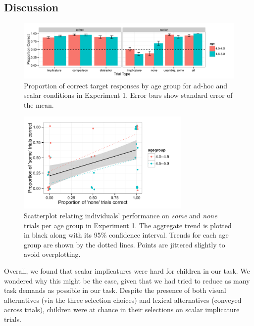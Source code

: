 \documentclass[10pt,letterpaper]{article}
\begin{document}
\subsection{Discussion}

\begin{figure}[t] 
  \begin{center} 
    \includegraphics[width=7.5in]{figures/implicatures_adhocScalar_long.pdf} 
    \caption{\label{fig:expt1} Proportion of correct target responses by age group for ad-hoc and scalar conditions in Experiment 1. Error bars show standard error of the mean.}
    \end{center} 
\end{figure}

\begin{figure}[h] 
  \begin{center} 
    \includegraphics[width=3.3in]{figures/implicatures_adhocScalar_scatterplot.pdf} 
    \caption{\label{fig:expt1scatterplot} Scatterplot relating individuals' performance on \emph{some} and \emph{none} trials per age group in Experiment 1. The aggregate trend is plotted in black along with its 95\% confidence interval. Trends for each age group are shown by the dotted lines. Points are jittered slightly to avoid overplotting.}
    \end{center} 
\end{figure}


Overall, we found that scalar implicatures were hard for children in our task. We wondered why this might be the case, given that we had tried to reduce as many task demands as possible in our task. Despite the presence of both visual alternatives (via the three selection choices) and lexical alternatives (conveyed across trials), children were at chance in their selections on scalar implicature trials. 
\end{document}
